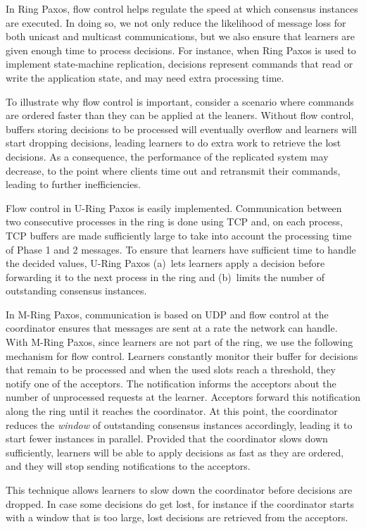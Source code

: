 \documentclass[final,3p,times,twocolumn,authoryear]{elsarticle}
\begin{document}
In Ring Paxos, flow control helps regulate the speed at which consensus instances are executed. In doing so, we not only reduce the likelihood of message loss for both unicast and multicast communications, but we also ensure that learners are given enough time to process decisions. For instance, when Ring Paxos is used to implement state-machine replication, decisions represent commands that read or write the application state, and may need extra processing time.

To illustrate why flow control is important, consider a scenario where commands are ordered faster than they can be applied at the leaners. Without flow control, buffers storing decisions to be processed will eventually overflow and learners will start dropping decisions, leading learners to do extra work to retrieve the lost decisions.  As a consequence, the performance of the replicated system may decrease, to the point where clients time out and retransmit their commands, leading to further inefficiencies.

Flow control in U-Ring Paxos is easily implemented. Communication between two consecutive processes in the ring is done using TCP and, on each process, TCP buffers are made sufficiently large to take into account the processing time of Phase 1 and 2 messages. To ensure that learners have sufficient time to handle the decided values, U-Ring Paxos (a)~lets learners apply a decision before forwarding it to the next process in the ring and (b)~limits the number of outstanding consensus instances.

In M-Ring Paxos, communication is based on UDP and flow control at the coordinator ensures that messages are sent at a rate the network can handle. With M-Ring Paxos, since learners are not part of the ring, we use the following mechanism for flow control. Learners constantly monitor their buffer for decisions that remain to be processed and when the used slots reach a threshold, they  notify one of the acceptors. The notification informs the acceptors about the number of unprocessed requests at the learner. Acceptors forward this notification along the ring until it reaches the coordinator. At this point, the coordinator reduces the \emph{window} of outstanding consensus instances accordingly, leading it to start fewer instances in parallel. Provided that the coordinator slows down sufficiently, learners will be able to apply decisions as fast as they are ordered,  and they will stop sending notifications to the acceptors. 

This technique allows learners to slow down the coordinator before decisions are dropped. In case some decisions do get lost, for instance if the coordinator starts with a window that is too large, lost decisions are retrieved from the acceptors. 
\end{document}
